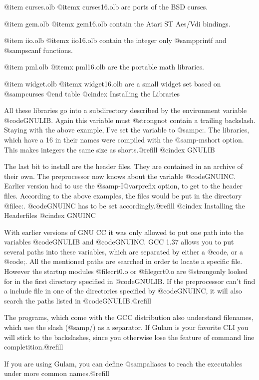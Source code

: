 {@item curses.olb
@itemx curses16.olb
are ports of the BSD curses.

@item gem.olb
@itemx gem16.olb
contain the Atari ST Aes/Vdi bindings.

@item iio.olb
@itemx iio16.olb
contain the integer only @samp{printf} and @samp{scanf} functions.

@item pml.olb
@itemx pml16.olb
are the portable math libraries.

@item widget.olb
@itemx widget16.olb
are a small widget set based on @samp{curses}
@end table
@cindex Installing the Libraries

All these libraries go into a subdirectory described by the environment
variable @code{GNULIB}. Again this variable must @strong{not} contain a
trailing backslash. Staying with the above example, I've set the variable to
@samp{c:\gnu\lib}. The libraries, which have a 16 in their names were
compiled with the @samp{-mshort} option. This makes integers the same
size as shorts.@refill
@cindex GNULIB

The last bit to install are the header files. They are contained in an
archive of their own. The preprocessor now knows about the variable
@code{GNUINC}. Earlier version had to use the @samp{-I@var{prefix}}
option, to get to the header files. According to the above examples, the
files would be put in the directory @file{c:\gnu}. @code{GNUINC}
has to be set accordingly.@refill
@cindex Installing the Headerfiles
@cindex GNUINC

With earlier versions of GNU CC it was only allowed to put one path into
the variables @code{GNULIB} and @code{GNUINC}. GCC 1.37 allows you to
put several paths into these variables, which are separated by either a
@code{,} or a @code{;}. All the mentioned paths are searched in order to
locate a specific file. However the startup modules @file{crt0.o} or
@file{gcrt0.o} are
@strong{only} looked for in the first directory specified in
@code{GNULIB}. If the preprocessor can't find a include file in one of
the directories specified by @code{GNUINC}, it will also search the
paths listed in @code{GNULIB}.@refill

The programs, which come with the GCC distribution also understand
filenames, which use the slash (@samp{/}) as a separator. If Gulam
is your favorite CLI you will stick to the backslashes, since you
otherwise lose the feature of command line completition.@refill

If you are using Gulam, you can define @samp{aliases} to reach the
executables under more common names.@refill

}
